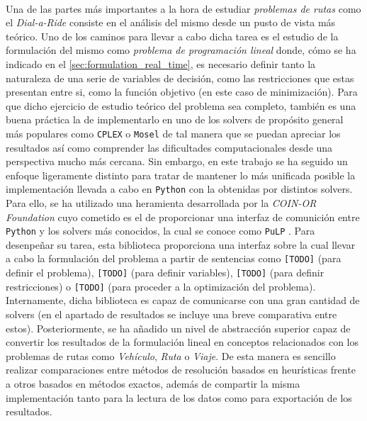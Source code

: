 \documentclass{subfiles}
\begin{document}
        \paragraph{}
        Una de las partes más importantes a la hora de estudiar \emph{problemas de rutas} como el \emph{Dial-a-Ride} consiste en el análisis del mismo desde un pusto de vista más teórico. Uno de los caminos para llevar a cabo dicha tarea es el estudio de la formulación del mismo como \emph{problema de programación lineal} donde, cómo se ha indicado en el \cref{sec:formulation_real_time}, es necesario definir tanto la naturaleza de una serie de variables de decisión, como las restricciones que estas presentan entre si, como la función objetivo (en este caso de minimización). Para que dicho ejercicio de estudio teórico del problema sea completo, también es una buena práctica la de implementarlo en uno de los solvers de propósito general más populares como \texttt{CPLEX} o \texttt{Mosel} de tal manera que se puedan apreciar los resultados así como comprender las dificultades computacionales desde una perspectiva mucho más cercana. Sin embargo, en este trabajo se ha seguido un enfoque ligeramente distinto para tratar de mantener lo más unificada posible la implementación llevada a cabo en \texttt{Python} con la obtenidas por distintos solvers. Para ello, se ha utilizado una heramienta desarrollada por la \emph{COIN-OR Foundation} cuyo cometido es el de proporcionar una interfaz de comunición entre \texttt{Python} y los solvers más conocidos, la cual se conoce como \texttt{PuLP} \cite{mitchell2011pulp}. Para desenpeñar su tarea, esta biblioteca proporciona una interfaz sobre la cual llevar a cabo la formulación del problema a partir de sentencias como \texttt{[TODO]} (para definir el problema), \texttt{[TODO]} (para definir variables), \texttt{[TODO]} (para definir restricciones) o \texttt{[TODO]} (para proceder a la optimización del problema). Internamente, dicha biblioteca es capaz de comunicarse con una gran cantidad de solvers (en el apartado de resultados se incluye una breve comparativa entre estos). Posteriormente, se ha añadido un nivel de abstracción superior capaz de convertir los resultados de la formulación lineal en conceptos relacionados con los problemas de rutas como \emph{Vehículo}, \emph{Ruta} o \emph{Viaje}. De esta manera es sencillo realizar comparaciones entre métodos de resolución basados en heurísticas frente a otros basados en métodos exactos, además de compartir la misma implementación tanto para la lectura de los datos como para exportación de los resultados.
\end{document}
